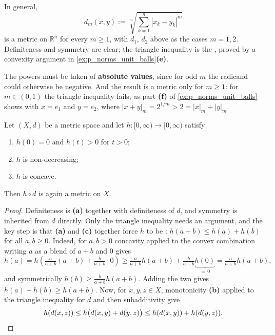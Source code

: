 In general,
\[
d_m(x,y) := \sqrt[m]{\sum_{k=1}^{n} |x_k - y_k|^m}
\]
is a metric on $\mathbb{R}^n$ for every $m \geq 1$, with $d_1$, $d_2$ above as the cases
$m = 1, 2$. Definiteness and symmetry are clear; the triangle inequality is the
, proved by a convexity argument in
\cref{ex:p_norms_unit_balls}\textbf{(e)}.

\begin{remark}
The powers must be taken of \textbf{absolute values}, since for odd $m$ the radicand could
otherwise be negative. And the result is a metric only for $m \geq 1$: for $m \in (0,1)$ the
triangle inequality fails, as part \textbf{(f)} of \cref{ex:p_norms_unit_balls} shows with
$x = e_1$ and $y = e_2$, where $|x+y|_m = 2^{1/m} > 2 = |x|_m + |y|_m$.
\end{remark}

\begin{proposition}
\label{prop:concave_reshaping_metric}
Let $(X,d)$ be a metric space and let $h : [0,\infty) \to [0,\infty)$ satisfy
\begin{enumerate}[label=\textbf{(\alph*)}]
  \item $h(0) = 0$ and $h(t) > 0$ for $t > 0$;
  \item $h$ is non-decreasing;
  \item $h$ is concave.
\end{enumerate}
Then $h \circ d$ is again a metric on $X$.
\end{proposition}

\begin{proof}
Definiteness is \textbf{(a)} together with definiteness of $d$, and symmetry is inherited from
$d$ directly. Only the triangle inequality needs an argument, and the key step is that
\textbf{(a)} and \textbf{(c)} together force $h$ to be : $h(a+b) \leq h(a) +
h(b)$ for all $a,b \geq 0$. Indeed, for $a,b>0$ concavity applied to the convex combination
writing $a$ as a blend of $a+b$ and $0$ gives
\[h(a) = h\!\left(\tfrac{a}{a+b}(a+b) + \tfrac{b}{a+b}\cdot 0\right)
  \geq \tfrac{a}{a+b}h(a+b) + \tfrac{b}{a+b}\underbrace{h(0)}_{=\,0} = \tfrac{a}{a+b}h(a+b),\]
and symmetrically $h(b) \geq \tfrac{b}{a+b}h(a+b)$. Adding the two gives $h(a)+h(b) \geq h(a+b)$.
Now, for $x,y,z \in X$, monotonicity \textbf{(b)} applied to the triangle inequality for $d$ and
then subadditivity give
\[h(d(x,z)) \leq h\big(d(x,y)+d(y,z)\big) \leq h(d(x,y)) + h(d(y,z)). \qedhere\]
\end{proof}

